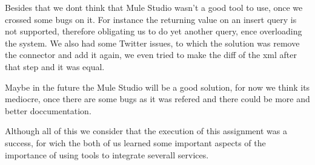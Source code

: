 \documentclass[12pt]{article}
\begin{document}
Besides that we dont think that Mule Studio wasn't a good tool to use, once we crossed some bugs on it. For instance the returning value on an insert query is not supported, therefore obligating us to do yet another query, ence overloading the system. We also had some Twitter issues, to which the solution was remove the connector and add it again, we even tried to make the diff of the xml after that step and it was equal.

Maybe in the future the Mule Studio will be a good solution, for now we think its mediocre, once there are some bugs as it was refered and there could be more and better doccumentation.

Although all of this  we consider that the execution of this assignment was a success, for wich the both of us learned some important aspects of the importance of using tools to integrate severall services.
\clearpage
\end{document}
